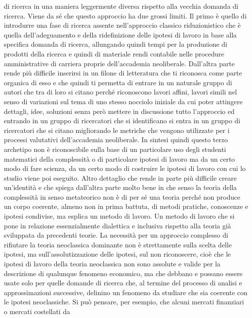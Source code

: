 \documentclass[a4paper, headings=standardclasses]{scrartcl}
\begin{document}
di ricerca in una maniera leggermente diversa rispetto alla vecchia domanda di ricerca.
Viene da sé che questo approccio ha due grossi limiti. Il primo è quello di introdurre una
fase di ricerca assente nell'approccio classico riduzionistico che è quella dell'adeguamento
e della ridefinizione delle ipotesi di lavoro in base alla specifica domanda di ricerca,
allungando quindi tempi per la produzione di prodotti della ricerca e quindi di materiale
rendi contabile nelle procedure amministrative di carriera proprie dell'accademia neoliberale.
Dall'altra parte rende più difficile inserirsi in un filone di letteratura che ti riconosca
come parte organica di esso e che quindi ti permetta di entrare in un naturale gruppo di
autori che tra di loro si citano perché riconoscono lavori affini, lavori simili nel senso di variazioni
sul tema di uno stesso nocciolo iniziale da cui poter attingere dettagli, idee, soluzioni
senza però mettere in discussione tutto l'approccio ed entrando in un gruppo di ricercatori che
si identificano si entra in un gruppo di ricercatori che si citano migliorando le metriche che vengono
utilizzate per i processi valutativi dell'accademia neoliberale. In sintesi quindi
questo terzo archetipo non è riconoscibile sulla base di un particolare uso degli studenti
matematici della complessità o di particolare ipotesi di lavoro ma da un certo modo di fare
scienza, da un certo modo di costruire le ipotesi di lavoro con cui lo studio viene poi eseguito.
Altro dettaglio che rende in parte più difficile creare un'identità e che spiega dall'altra parte
molto bene in che senso la teoria della complessità in senso metateorico non è di per sé una teoria
perché non produce un corpo coerente, almeno non in prima battuta, di metodi pratiche,
conoscenze e ipotesi condivise, ma esplica un metodo di lavoro.
Un metodo di lavoro che si pone in relazione essenzialmente dialettica e inclusiva rispetto
alla teoria già sviluppata da precedenti teorie. La necessità per un approccio complesso
di rifiutare la teoria neoclassica dominante non è strettamente sulla scelta delle ipotesi,
ma sull'assolutizzazione delle ipotesi, sul non riconoscere, cioè che le ipotesi di lavoro
della teoria neoclassica non sono assolute e valide per la descrizione di qualunque fenomeno
economico, ma che debbano e possano essere usate solo per quelle domande di ricerca che,
al termine del processo di analisi e approssimazioni successive,
delinino un fenomeno da studiare che sia coerente con le ipotesi neoclassiche.
Si può pensare, per esempio, che alcuni mercati finanziari o mercati costellati da
\end{document}
